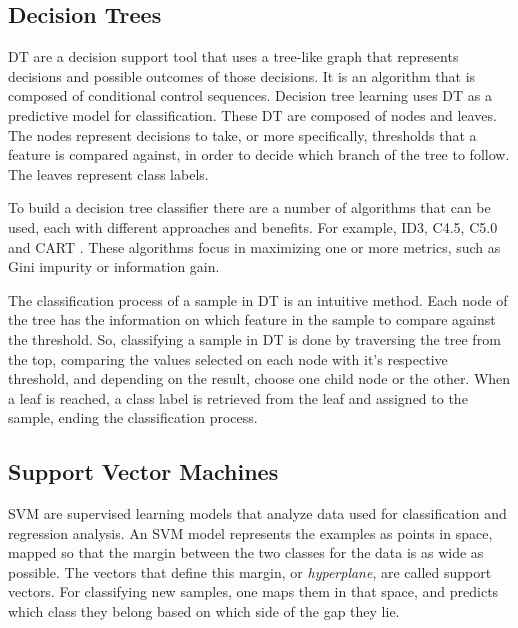 \subsection{Decision Trees}
\label{ssec:DecisionTrees}

\ac{DT} are a decision support tool that uses a tree-like graph that represents decisions and possible outcomes of those decisions. It is an algorithm that is composed of conditional control sequences. Decision tree learning uses \ac{DT} as a predictive model for classification.
These \ac{DT} are composed of nodes and leaves. The nodes represent decisions to take, or more specifically, thresholds that a feature is compared against, in order to decide which branch of the tree to follow. The leaves represent class labels.

To build a decision tree classifier there are a number of algorithms that can be used, each with different approaches and benefits. For example, ID3, C4.5, C5.0 and CART \cite{strobl2009introduction}. These algorithms focus in maximizing one or more metrics, such as Gini impurity or information gain.

The classification process of a sample in \ac{DT} is an intuitive method. Each node of the tree has the information on which feature in the sample to compare against the threshold. So, classifying a sample in \ac{DT} is done by traversing the tree from the top, comparing the values selected on each node with it's respective threshold, and depending on the result, choose one child node or the other. When a leaf is reached, a class label is retrieved from the leaf and assigned to the sample, ending the classification process.


\subsection{Support Vector Machines}
\label{ssec:SuportVectorMachines}

\ac{SVM} are supervised learning models that analyze data used for classification and regression analysis. An \ac{SVM} model represents the examples as points in space, mapped so that the margin between the two classes for the data is as wide as possible. The vectors that define this margin, or \textit{hyperplane}, are called support vectors. For classifying new samples, one maps them in that space, and predicts which class they belong based on which side of the gap they lie.

